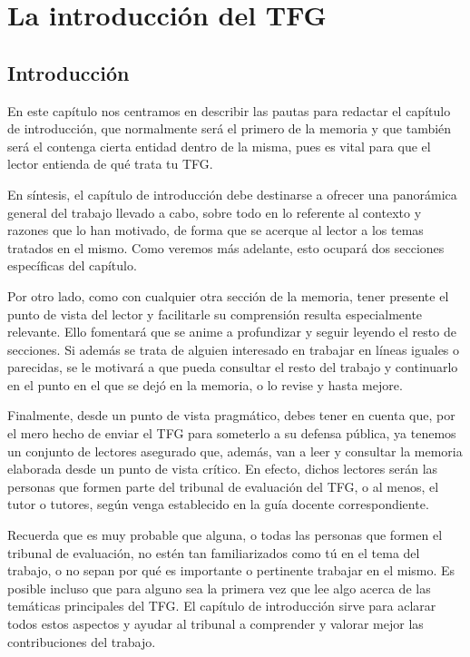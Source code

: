 \chapter{La introducción del TFG}
\label{cap:IntroducciónTFG}

\section{Introducción}

En este capítulo nos centramos en describir las pautas para redactar el capítulo de introducción, que normalmente será el primero de la memoria y que también será el contenga cierta entidad dentro de la misma, pues es vital para que el lector entienda de qué trata tu TFG.

En síntesis, el capítulo de introducción debe destinarse a ofrecer una panorámica general del trabajo llevado a cabo, sobre todo en lo referente al contexto y razones que lo han motivado, de forma que se acerque al lector a los temas tratados en el mismo. Como veremos más adelante, esto ocupará dos secciones específicas del capítulo.

Por otro lado, como con cualquier otra sección de la memoria, tener presente el punto de vista del lector y facilitarle su comprensión resulta especialmente relevante. Ello fomentará que se anime a profundizar y seguir leyendo el resto de secciones. Si además se trata de alguien interesado en trabajar en líneas iguales o parecidas, se le motivará a que pueda consultar el resto del trabajo y continuarlo en el punto en el que se dejó en la memoria, o lo revise y hasta mejore.

Finalmente, desde un punto de vista pragmático, debes tener en cuenta que, por el mero hecho de enviar el TFG para someterlo a su defensa pública, ya tenemos un conjunto de lectores asegurado que, además, van a leer y consultar la memoria elaborada desde un punto de vista crítico. En efecto, dichos lectores serán las personas que formen parte del tribunal de evaluación del TFG, o al menos, el tutor o tutores, según venga establecido en la guía docente correspondiente.

Recuerda que es muy probable que alguna, o todas las personas que formen el tribunal de evaluación, no estén tan familiarizados como tú en el tema del trabajo, o no sepan por qué es importante o pertinente trabajar en el mismo. Es posible incluso que para alguno sea la primera vez que lee algo acerca de las temáticas principales del TFG. El capítulo de introducción sirve para aclarar todos estos aspectos y ayudar al tribunal a comprender y valorar mejor las contribuciones del trabajo.

